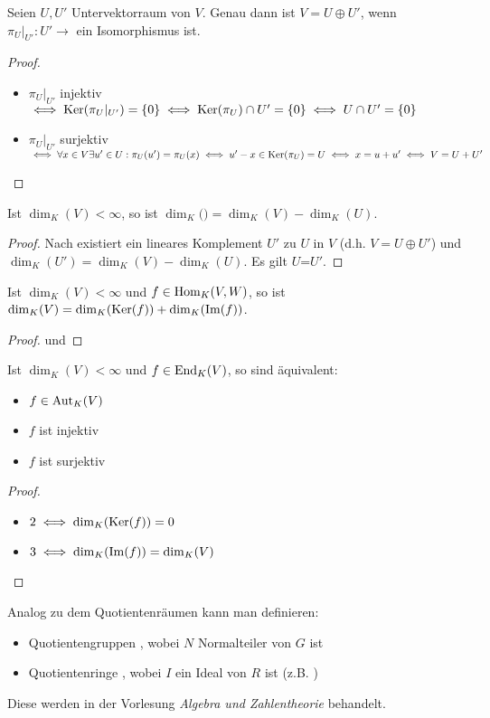 \begin{proposition}
	Seien $U,U'$ Untervektorraum von $V$. Genau dann ist $V=U\oplus U'$, wenn $\pi_U|_{U'}: U'\to$ ein Isomorphismus 
	ist.
\end{proposition}
\begin{proof}
	\begin{itemize}
		\item $\pi_U|_{U'}$ injektiv $\iff \operatorname{Ker}(\pi_U|_{U'})=\{0\}\iff \operatorname{Ker}(\pi_U)\cap U'=\{0\}\iff U\cap U'=\{0\}$
		\item $\pi_U|_{U'}$ surjektiv $\iff \forall x\in V \exists u'\in U: \pi_U(u')=\pi_U(x)\iff u'-x\in \operatorname{Ker}(\pi_U)=U\iff x=u+u'\iff V=U+U'$
	\end{itemize}
\end{proof}

\begin{conclusion}
	Ist $\dim_K(V)<\infty$, so ist $\dim_K($$)=\dim_K(V)-\dim_K(U)$.
\end{conclusion}
\begin{proof}
	Nach  existiert ein lineares Komplement $U'$ zu $U$ in $V$ (d.h. $V=U\oplus U'$) und $\dim_K(U')=\dim_K(V)-\dim_K(U)$. Es gilt 
	{$U$}=$U'$.
\end{proof}

\begin{conclusion}
	Ist $\dim_K(V)<\infty$ und $f\in \operatorname{Hom}_K(V,W)$, so ist $\dim_K(V)=\dim_K(\operatorname{Ker}(f))+\dim_K(\operatorname{Im}(f))$.
\end{conclusion}
\begin{proof}
	 und 
\end{proof}

\begin{conclusion}
	Ist $\dim_K(V)<\infty$ und $f\in \operatorname{End}_K(V)$, so sind äquivalent:
	\begin{itemize}
		\item $f\in \operatorname{Aut}_K(V)$
		\item $f$ ist injektiv
		\item $f$ ist surjektiv
	\end{itemize}
\end{conclusion}
\begin{proof}
	\begin{itemize}
		\item $2\iff \dim_K(\operatorname{Ker}(f))=0$
		\item $3\iff \dim_K(\operatorname{Im}(f))=\dim_K(V)$
	\end{itemize}
\end{proof}

\begin{remark}
	Analog zu dem Quotientenräumen kann man definieren:
	\begin{itemize}
		\item Quotientengruppen , wobei $N$ Normalteiler von $G$ ist
		\item Quotientenringe , wobei $I$ ein Ideal von $R$ ist (z.B. )
	\end{itemize}
	Diese werden in der Vorlesung \textit{Algebra und Zahlentheorie} behandelt.
\end{remark}